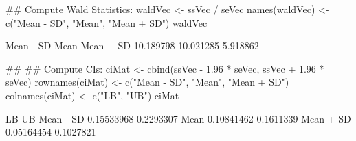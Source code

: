 \begin{Schunk}
\begin{Sinput}
 ## Compute Wald Statistics:
 waldVec <- ssVec / seVec
 names(waldVec) <- c("Mean - SD", "Mean", "Mean + SD")
 waldVec
\end{Sinput}
\begin{Soutput}
Mean - SD      Mean Mean + SD 
10.189798 10.021285  5.918862 
\end{Soutput}
\begin{Sinput}
 ##
 ## Compute CIs:
 ciMat <- cbind(ssVec - 1.96 * seVec,
                ssVec + 1.96 * seVec)
 rownames(ciMat) <- c("Mean - SD", "Mean", "Mean + SD")
 colnames(ciMat) <- c("LB", "UB")
 ciMat
\end{Sinput}
\begin{Soutput}
                  LB        UB
Mean - SD 0.15533968 0.2293307
Mean      0.10841462 0.1611339
Mean + SD 0.05164454 0.1027821
\end{Soutput}
\end{Schunk}
